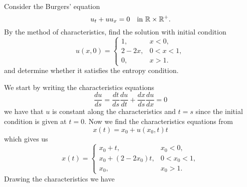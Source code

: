 \newpage
\begin{exercise}
    Consider the Burgers' equation
    \[
        u_t + u u_x = 0 \quad \text{in } \mathbb{R} \times \mathbb{R}^+.
    \]
    By the method of characteristics, find the solution with initial condition
    \[
        u(x,0) = \begin{cases}
            1, & x < 0, \\
            2 - 2x, & 0 < x < 1, \\
            0, & x > 1.
        \end{cases}
    \]
    and determine whether it satisfies the entropy condition.
\end{exercise}
We start by writing the characteristics equations
\[
    \frac{du}{ds} = \frac{dt}{ds} \frac{du}{dt} + \frac{dx}{ds} \frac{du}{dx} = 0
\]
we have that \(u\) is constant along the characteristics and \(t=s\) since the initial condition is given at \(t=0\). 
Now we find the characteristics equations from 
\[
    x(t) = x_0 + u(x_0, t) t
\]
which gives us
\[
    x(t) = \begin{cases}
        x_0 + t, & x_0 < 0, \\
        x_0 + (2 - 2x_0)t, &  0 < x_0 < 1, \\
        x_0, & x_0 > 1.
    \end{cases}
\]
Drawing the characteristics we have
